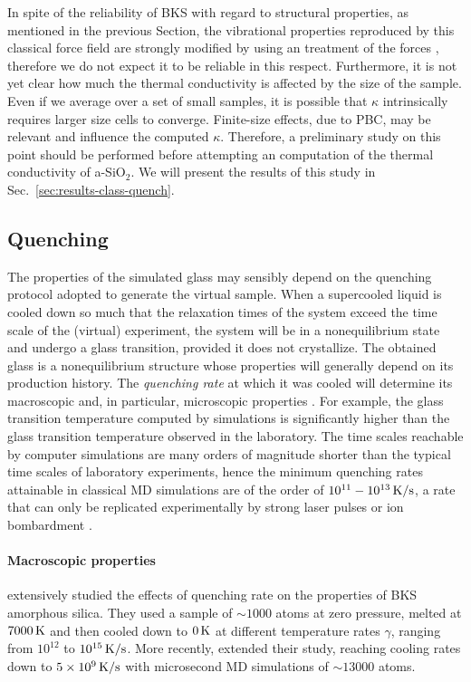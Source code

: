 In spite of the reliability of BKS with regard to structural properties, as mentioned in the previous Section, the vibrational properties reproduced by this classical force field are strongly modified by using an \abinitio treatment of the forces \cite{Benoit2002}, therefore we do not expect it to be reliable in this respect. 
Furthermore, it is not yet clear how much the thermal conductivity is affected by the size of the sample. Even if we average over a set of small samples, it is possible that $\kappa$ intrinsically requires larger size cells to converge. Finite-size effects, due to PBC, may be relevant and influence the computed $\kappa$. 
Therefore, a preliminary study on this point should be performed before attempting an \abinitio computation of the thermal conductivity of a-SiO$_2$. We will present the results of this study in Sec.~\ref{sec:results-class-quench}.



\subsection{Quenching}  \label{sec:silica-quenching}

The properties of the simulated glass may sensibly depend on the quenching protocol adopted to generate the virtual sample. 
When a supercooled liquid is cooled down so much that the relaxation times of the system exceed the time scale of the (virtual) experiment, the system will be in a nonequilibrium state and undergo a glass transition, provided it does not crystallize. The obtained glass is a nonequilibrium structure whose properties will generally depend on its production history. The \emph{quenching rate} at which it was cooled will determine its macroscopic and, in particular, microscopic properties \cite{Vollmayr1996}. 
For example, the glass transition temperature computed by simulations is significantly higher than the glass transition temperature observed in the laboratory. 
The time scales reachable by computer simulations are many orders of magnitude shorter than the typical time scales of laboratory experiments, hence the minimum quenching rates attainable in classical MD simulations are of the order of $10^{11}-10^{13}\,\mathrm{K/s}$, a rate that can only be replicated experimentally by strong laser pulses or ion bombardment \cite{Soules2011}.


\paragraph{Macroscopic properties}
\citet{Vollmayr1996} extensively studied the effects of quenching rate on the properties of BKS amorphous silica. They used a sample of $\sim 1000$ atoms at zero pressure, melted at $7000\,\mathrm{K}$ and then cooled down to $0\,\mathrm{K}$ at different temperature rates $\gamma$, ranging from $10^{12}$ to $10^{15}\,\mathrm{K/s}$. More recently, \citet{Lane2015} extended their study, reaching cooling rates down to $5\times 10^{9}\,\mathrm{K/s}$ with microsecond MD simulations of $\sim 13000$ atoms.

